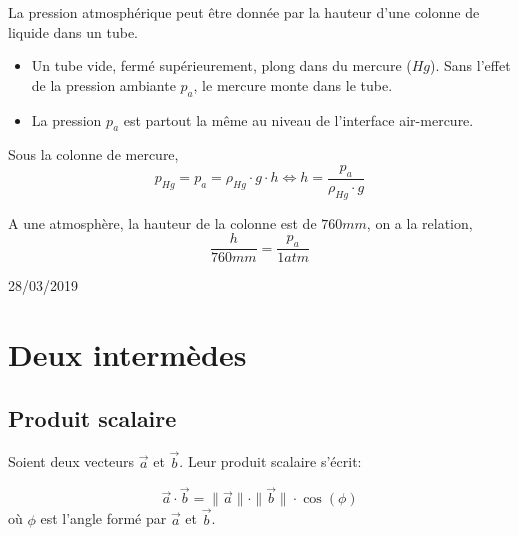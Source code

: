 \documentclass[
    11pt,
    a4paper,
    oneside,
    headinlcude, footinclude,
    twoside,
]{report}
\renewcommand{\vec}[1]{\overrightarrow{#1}}
\begin{document}
La pression atmosph\'erique peut \^etre donn\'ee par la hauteur d'une colonne de
liquide dans un tube.

\begin{center}
    \begin{minipage}{.5\linewidth}
    \end{minipage}
    \begin{minipage}{.49\linewidth}
        \setlength{\parskip}{.3em}
        \begin{itemize}
            \item Un tube vide, ferm\'e sup\'erieurement, plong dans du mercure
                ($Hg$). Sans l'effet de la pression ambiante $p_{a}$, le mercure
                monte dans le tube.
            \item La pression $p_{a}$ est partout la m\^eme au niveau de
                l'interface air-mercure.
        \end{itemize}
    \end{minipage}
\end{center}

Sous la colonne de mercure,
\begin{equation}
    p_{Hg} = p_{a} = \rho_{Hg} \cdot g \cdot h \iff h = \frac{p_{a}}{\rho_{Hg} \cdot g}
\end{equation}

A une atmosph\`ere, la hauteur de la colonne est de $760 mm$, on a la relation, 
\begin{equation}
    \frac{h}{760mm} = \frac{p_{a}}{1 atm}
\end{equation}


 28/03/2019

\section{Deux intermèdes}
\label{sec:deux_intermedes}

\subsection{Produit scalaire}
\label{sub:produit_scalaire}

Soient deux vecteurs $\vec a$ et $\vec b$. Leur produit scalaire s'écrit:

\begin{center}
    \begin{minipage}{.5\linewidth}
    \end{minipage}
    \begin{minipage}{.49\linewidth}
        \setlength{\parskip}{.3em}
        \begin{equation}
            \label{eq:3.46}
            \vec a \cdot \vec b = \| \vec a \| \cdot \|\vec b\| \cdot \cos(\phi)
        \end{equation}
        où $\phi$ est l'angle formé par $\vec a$ et $\vec b$.
    \end{minipage}
\end{center}
\end{document}
